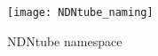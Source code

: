 \begin{figure}[htbp]
  \centering
  \texttt{[image: NDNtube\_naming]}
  \vspace{-0.3cm}
  \caption{NDNtube namespace}
  \label{fig:NDNtube_naming}
\end{figure}

